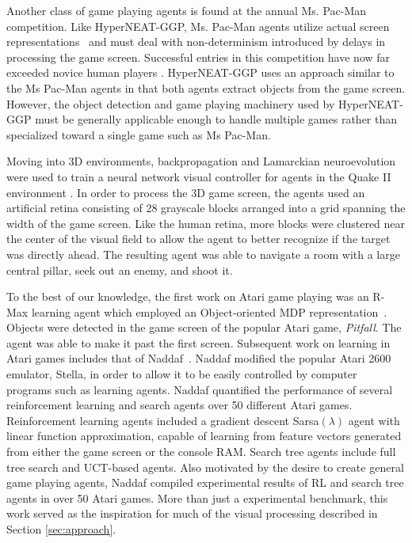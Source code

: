 \documentclass{sig-alternate}
\begin{document}
Another class of game playing agents is found at the annual Ms. Pac-Man competition. Like HyperNEAT-GGP, Ms. Pac-Man agents utilize actual screen representations~\cite{pacmancompetition} and must deal with non-determinism introduced by delays in processing the game screen. Successful entries in this competition have now far exceeded novice human players \cite{sigevolution2007}. HyperNEAT-GGP uses an approach similar to the Ms Pac-Man agents in that both agents extract objects from the game screen. However, the object detection and game playing machinery used by HyperNEAT-GGP must be generally applicable enough to handle multiple games rather than specialized toward a single game such as Ms Pac-Man.

Moving into 3D environments, backpropagation and Lamarckian neuroevolution were used to train a neural network visual controller for agents in the Quake II environment \cite{parker09}. In order to process the 3D game screen, the agents used an artificial retina consisting of 28 grayscale blocks arranged into a grid spanning the width of the game screen. Like the human retina, more blocks were clustered near the center of the visual field to allow the agent to better recognize if the target was directly ahead. The resulting agent was able to navigate a room with a large central pillar, seek out an enemy, and shoot it. 

To the best of our knowledge, the first work on Atari game playing was an R-Max learning agent which employed an Object-oriented MDP representation~\cite{duik08}. Objects were detected in the game screen of the popular Atari game, \emph{Pitfall}. The agent was able to make it past the first screen. Subsequent work on learning in Atari games includes that of Naddaf~\cite{naddaf10}. Naddaf modified the popular Atari 2600 emulator, Stella, in order to allow it to be easily controlled by computer programs such as learning agents. Naddaf quantified the performance of several reinforcement learning and search agents over 50 different Atari games. Reinforcement learning agents included a gradient descent Sarsa$(\lambda)$ agent with linear function approximation, capable of learning from feature vectors generated from either the game screen or the console RAM. Search tree agents include full tree search and UCT-based agents. Also motivated by the desire to create general game playing agents, Naddaf compiled experimental results of RL and search tree agents in over 50 Atari games. More than just a experimental benchmark, this work served as the inspiration for much of the visual processing described in Section \ref{sec:approach}.
\end{document}
